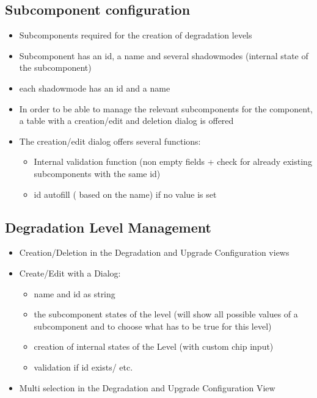\subsection{Subcomponent configuration}
\begin{itemize}
    \item Subcomponents required for the creation of degradation levels
    \item Subcomponent has an id, a name and several shadowmodes (internal state of the subcomponent)
    \item each shadowmode has an id and a name 
    \item In order to be able to manage the relevant subcomponents for the component, a table with a creation/edit and deletion dialog is offered
    \item The creation/edit dialog offers several functions: 
        \begin{itemize}
            \item Internal validation function (non empty fields + check for already existing subcomponents with the same id)
            \item id autofill ( based on the name) if no value is set
        \end{itemize}
\end{itemize}

\subsection{Degradation Level Management}
\begin{itemize}
    \item Creation/Deletion in the Degradation and Upgrade Configuration views
    \item Create/Edit with a Dialog:
    \begin{itemize}
        \item name and id as string
        \item the subcomponent states of the level (will show all possible values of a subcomponent and to choose what has to be true for this level)
        \item creation of internal states of the Level (with custom chip input)
        \item validation if id exists/ etc.
    \end{itemize}
    \item Multi selection in the Degradation and Upgrade Configuration View
\end{itemize}

